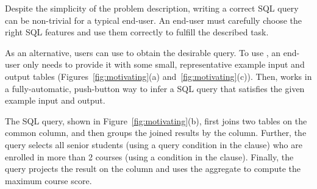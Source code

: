 Despite the simplicity of the problem description,
writing a correct SQL query  can be non-trivial for a typical
end-user. An end-user must carefully choose the
right SQL features and use them correctly
to fulfill the described task.

As an alternative, users can use \ourtool to obtain
the desirable query.
To use \ourtool, an end-user only needs to provide it with
some small, representative example input and output tables
(Figures~\ref{fig:motivating}(a) and~\ref{fig:motivating}(c)).
Then, \ourtool works in a fully-automatic, push-button
way to infer a SQL query that satisfies the given
example input and output.


The SQL query, shown in Figure~\ref{fig:motivating}(b),
first joins two tables on the common  column,
and then groups the joined results by the 
column. Further, the query selects all senior
students (using a query condition in the 
clause) who are enrolled in more than 2 courses
(using a condition in the  clause).
Finally, the query projects the result on the
 column and uses the  aggregate
to compute the maximum course score.







